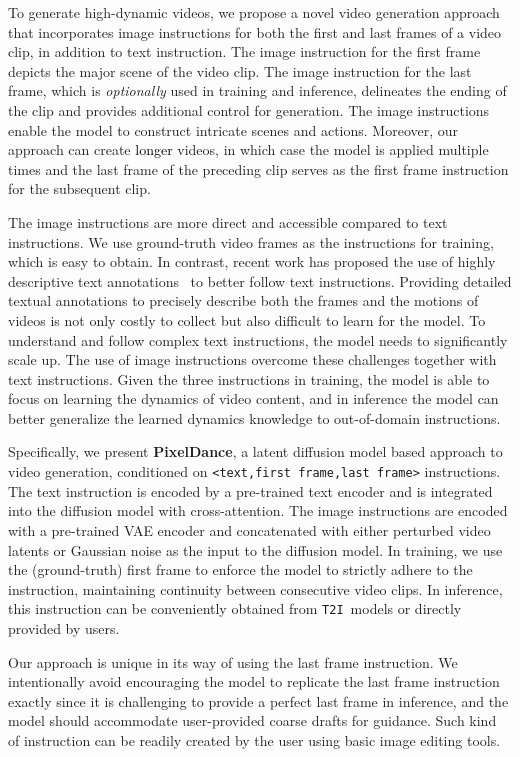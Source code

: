 \documentclass[10pt,twocolumn,letterpaper]{article}
\newcommand{\tcg}{\textcolor{black}}
\newcommand{\ti}{{\texttt{T2I}}}
\newcommand{\ours}{{PixelDance}}
\begin{document}
To generate high-dynamic videos, we propose a novel video generation approach that incorporates image instructions for both the first and last frames of a video clip, in addition to text instruction. The image instruction for the first frame depicts the major scene of the video clip. The image instruction for the last frame, which is {\it optionally} used in training and inference, delineates the ending of the clip and provides additional control for generation. The image instructions enable the model to construct intricate scenes and actions. Moreover, our approach can create \tcg{longer} videos, in which case the model is applied multiple times and the last frame of the preceding clip serves as the first frame instruction for the subsequent clip.


The image instructions are more direct and accessible compared to text instructions. We use ground-truth video frames as the instructions for training, which is easy to obtain. In contrast, recent work has proposed the use of highly descriptive text annotations~\cite{dalle3} to better follow text instructions. Providing detailed textual annotations to precisely describe both the frames and the motions of videos is not only costly to collect but also difficult to learn for the model. To understand and follow complex text instructions, the model needs to significantly scale up. The use of image instructions overcome these challenges together with text instructions. Given the three instructions in training, the model is able to focus on learning the dynamics of video content, and in inference the model can better generalize the learned dynamics knowledge to out-of-domain instructions. 


Specifically, we present \textbf{\ours}, a latent diffusion model based approach to video generation, conditioned on \texttt{<text,first frame,last frame>} instructions. The text instruction is encoded by a pre-trained text encoder and is integrated into the diffusion model with cross-attention. The image instructions are encoded with a pre-trained VAE encoder \cite{rombach2022high} and concatenated with either perturbed video latents or Gaussian noise as the input to the diffusion model. 
In training, we use the (ground-truth) first frame to enforce the model to strictly adhere to the instruction, maintaining continuity between consecutive video clips. In inference, this instruction can be conveniently obtained from \ti~models \cite{rombach2022high} or directly provided by users. 


Our approach is unique in its way of using the last frame instruction. We intentionally avoid encouraging the model to replicate the last frame instruction exactly since it is challenging to provide a perfect last frame in inference, and the model should accommodate user-provided coarse drafts for guidance. Such kind of instruction can be readily created by the user using basic image editing tools. 
\end{document}
